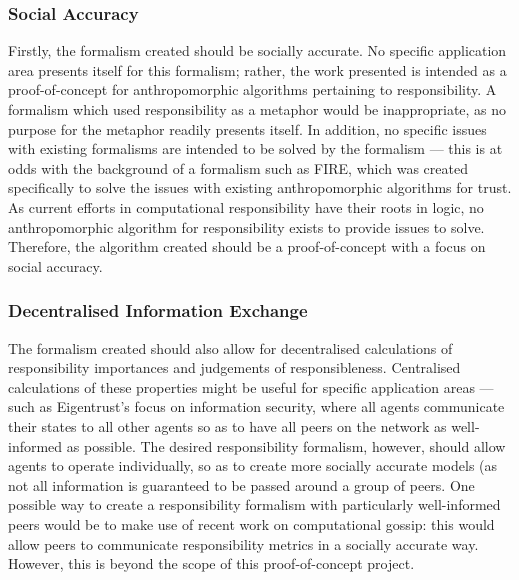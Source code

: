 \subsubsection{Social Accuracy}
Firstly, the formalism created should be socially accurate. No specific application area presents itself for this formalism; rather, the work presented is intended as a proof-of-concept for anthropomorphic algorithms pertaining to responsibility. A formalism which used responsibility as a metaphor would be inappropriate, as no purpose for the metaphor readily presents itself. In addition, no specific issues with existing formalisms are intended to be solved by the formalism --- this is at odds with the background of a formalism such as FIRE, which was created specifically to solve the issues with existing anthropomorphic algorithms for trust. As current efforts in computational responsibility have their roots in logic, no anthropomorphic algorithm for responsibility exists to provide issues to solve. Therefore, the algorithm created should be a proof-of-concept with a focus on social accuracy.\par

\subsubsection{Decentralised Information Exchange}
The formalism created should also allow for decentralised calculations of responsibility importances and judgements of responsibleness. Centralised calculations of these properties might be useful for specific application areas --- such as Eigentrust's focus on information security, where all agents communicate their states to all other agents so as to have all peers on the network as well-informed as possible. The desired responsibility formalism, however, should allow agents to operate individually, so as to create more socially accurate models (as not all information is guaranteed to be passed around a group of peers. One possible way to create a responsibility formalism with particularly well-informed peers would be to make use of recent work on computational gossip\cite{Boyd2006,Lavaei2012}: this would allow peers to communicate responsibility metrics in a socially accurate way. However, this is beyond the scope of this proof-of-concept project.\par

